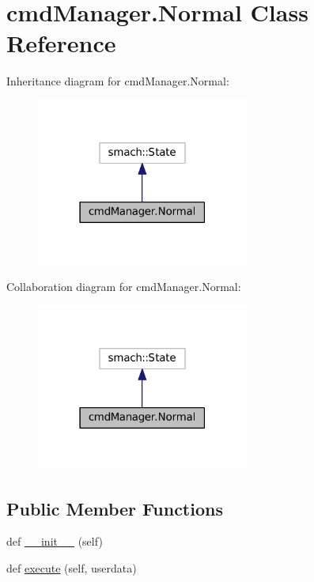 \hypertarget{classcmdManager_1_1Normal}{}\section{cmd\+Manager.\+Normal Class Reference}
\label{classcmdManager_1_1Normal}


Inheritance diagram for cmd\+Manager.\+Normal\+:
\nopagebreak
\begin{figure}[H]
\begin{center}
\leavevmode
\includegraphics[width=198pt]{classcmdManager_1_1Normal__inherit__graph}
\end{center}
\end{figure}


Collaboration diagram for cmd\+Manager.\+Normal\+:
\nopagebreak
\begin{figure}[H]
\begin{center}
\leavevmode
\includegraphics[width=198pt]{classcmdManager_1_1Normal__coll__graph}
\end{center}
\end{figure}
\subsection*{Public Member Functions}
\begin{DoxyCompactItemize}
\item 
def \hyperlink{classcmdManager_1_1Normal_ab492c9d6b86cabc1673e7d128d554c17}{\+\_\+\+\_\+init\+\_\+\+\_\+} (self)
\item 
def \hyperlink{classcmdManager_1_1Normal_a3290ae1ca5346a38bd735b24ed20d359}{execute} (self, userdata)
\end{DoxyCompactItemize}
